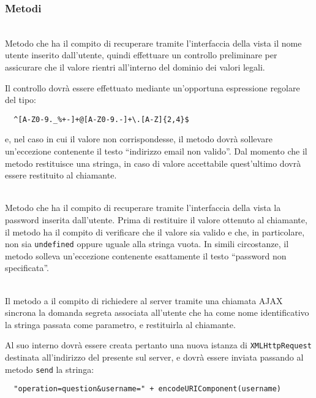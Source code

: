 \subsubsection*{Metodi}
\begin{description}

\item{}\\
Metodo che ha il compito di recuperare tramite l'interfaccia della vista il nome utente inserito dall'utente, quindi effettuare un controllo preliminare per assicurare che il valore rientri all'interno del dominio dei valori legali.

Il controllo dovrà essere effettuato mediante un'opportuna espressione regolare del tipo:
\begin{verbatim}
  ^[A-Z0-9._%+-]+@[A-Z0-9.-]+\.[A-Z]{2,4}$
\end{verbatim}
e, nel caso in cui il valore non corrispondesse, il metodo dovrà sollevare un'eccezione contenente il testo ``indirizzo email non valido''. Dal momento che il metodo restituisce una stringa, in caso di valore accettabile quest'ultimo dovrà essere restituito al chiamante.

\item{}\\
Metodo che ha il compito di recuperare tramite l'interfaccia della vista la password inserita dall'utente. Prima di restituire il valore ottenuto al chiamante, il metodo ha il compito di verificare che il valore sia valido e che, in particolare, non sia \verb+undefined+ oppure uguale alla stringa vuota. In simili circostanze, il metodo solleva un'eccezione contenente esattamente il testo ``password non specificata''.

\item{}\\
Il metodo a il compito di richiedere al server tramite una chiamata AJAX sincrona la domanda segreta associata all'utente che ha come nome identificativo la stringa passata come parametro, e restituirla al chiamante.

Al suo interno dovrà essere creata pertanto una nuova istanza di \verb+XMLHttpRequest+ destinata all'indirizzo del  presente sul server, e dovrà essere inviata  passando al metodo \verb+send+ la stringa:
\begin{verbatim}
  "operation=question&username=" + encodeURIComponent(username)
\end{verbatim}


\end{description}
